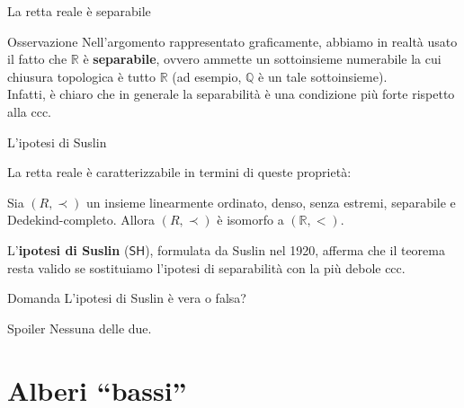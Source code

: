 \documentclass{beamer}
\theoremstyle{num.custom-title}
\theoremstyle{custom-title}
\DeclareMathOperator{\down}{\downarrow}
\newcommand{\SH}{\ensuremath{\mathsf{SH}}\xspace}
\newcommand{\Q}{\mathbb{Q}}
\newcommand{\R}{\mathbb{R}}
\newcommand*{\defeq}{\mathrel{\rlap{%
                     \raisebox{0.3ex}{$\cdot$}}%
                     \raisebox{-0.3ex}{$\cdot$}}%
                     =}
\renewcommand{\emph}[1]{\textbf{#1}}
\begin{document}
\begin{frame}{La retta reale è separabile}

\begin{alertblock}{Osservazione}
Nell'argomento rappresentato graficamente, abbiamo in realtà usato il fatto che $\R$ è \emph{separabile}, ovvero ammette un sottoinsieme numerabile la cui chiusura topologica è tutto $\R$ (ad esempio, $\Q$ è un tale sottoinsieme).\\
Infatti, è chiaro che in generale la separabilità è una condizione più forte rispetto alla ccc.
\end{alertblock}

\end{frame}


\begin{frame}{L'ipotesi di Suslin}

La retta reale è caratterizzabile in termini di queste proprietà:

\begin{theorem}[Cantor, 1895]
Sia $(R,\prec)$ un insieme linearmente ordinato, denso, senza estremi, separabile e Dedekind-completo. Allora $(R,\prec)$ è isomorfo a $(\R,<)$.
\end{theorem}

\pause

L'\emph{ipotesi di Suslin} (\SH), formulata da Suslin nel 1920, afferma che il teorema resta valido se sostituiamo l'ipotesi di separabilità con la più debole ccc.

\pause

\begin{exampleblock}{Domanda}
L'ipotesi di Suslin è vera o falsa?
\end{exampleblock}

\pause 

\begin{alertblock}{Spoiler}
Nessuna delle due.
\end{alertblock}

\end{frame}


\section{Alberi ``bassi''}

%
%
\end{document}
